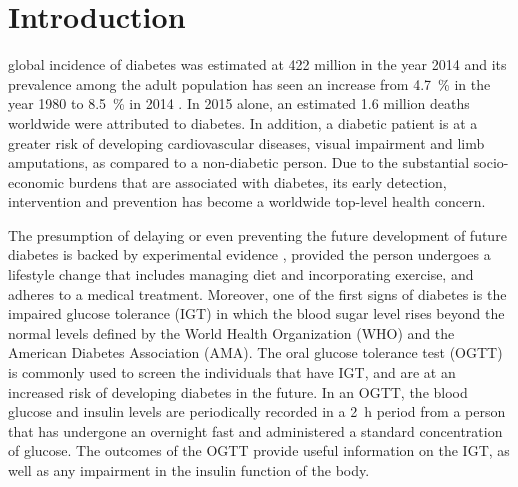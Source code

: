 \documentclass[journal,comsoc]{IEEEtran}
\renewcommand{\^}{\hat}  %
\begin{document}
%
\IEEEpeerreviewmaketitle



\section{Introduction}
%
%
%
%
 global incidence of diabetes was estimated at \num{422} million in the year \num{2014} and its prevalence among the adult population has seen an increase from \SI{4.7}{\percent} in the year \num{1980} to \SI{8.5}{\percent} in \num{2014} \cite{mathers_projections_2006}. In \num{2015} alone, an estimated \num{1.6} million deaths worldwide were attributed to diabetes. In addition, a diabetic patient is at a greater risk of developing cardiovascular diseases, visual impairment and limb amputations, as compared to a non-diabetic person. Due to the substantial socio-economic burdens that are associated with diabetes, its early detection, intervention and prevention has become a worldwide top-level health concern.


The presumption of delaying or even preventing the future development of future diabetes is backed by experimental evidence \cite{tuomilehto2001prevention}, provided the person undergoes a lifestyle change that includes managing diet and incorporating exercise, and adheres to a medical treatment. Moreover, one of the first signs of diabetes is the impaired glucose tolerance (IGT) in which the blood sugar level rises beyond the normal levels defined by the World Health Organization (WHO) and the American Diabetes Association (AMA). The oral glucose tolerance test (OGTT) is commonly used to screen the individuals that have IGT, and are at an increased risk of developing diabetes in the future. In an OGTT, the blood glucose and insulin levels are periodically recorded in a \SI{2}{\hour} period from a person that has undergone an overnight fast and administered a standard concentration of glucose. The outcomes of the OGTT provide useful information on the IGT, as well as any impairment in the insulin function of the body.
\end{document}
